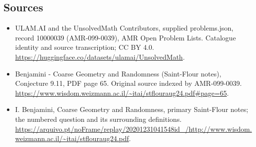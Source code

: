 \documentclass[11pt,a4paper]{article}
\begin{document}
\subsection{Sources}
\begin{itemize}
\item[S1] ULAM.AI and the UnsolvedMath Contributors, supplied problems.json, record 10000039 (AMR-099-0039), AMR Open Problem Lists. Catalogue identity and source transcription; CC BY 4.0.
\url{https://huggingface.co/datasets/ulamai/UnsolvedMath}.
\item[S2] Benjamini - Coarse Geometry and Randomness (Saint-Flour notes), Conjecture 9.11, PDF page 65. Original source indexed by AMR-099-0039.
\url{https://www.wisdom.weizmann.ac.il/~itai/stflouraug24.pdf#page=65}.
\item[S3] I. Benjamini, Coarse Geometry and Randomness, primary Saint-Flour notes; the numbered question and its surrounding definitions.
\url{https://arquivo.pt/noFrame/replay/20201231041548id_/http://www.wisdom.weizmann.ac.il/~itai/stflouraug24.pdf}.
\end{itemize}
\end{document}
